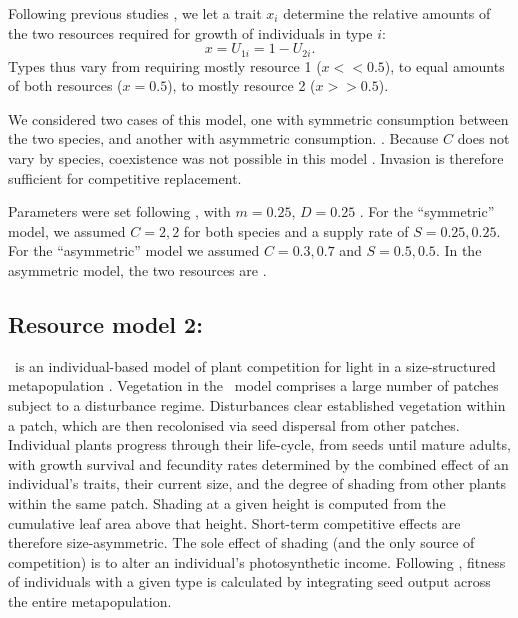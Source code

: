\documentclass[a4paper,11pt]{article}
\newcommand{\verify}[1]{{\color{navy}{(verify: #1)}}}
\begin{document}
Following previous studies \citep{Tilman-1985, Schreiber-2003, Fox-2008}, we let a trait $x_i$ determine the relative amounts of the two resources required for growth of individuals in type $i$: \begin{equation}
\label{eq:R3}
x = U_{1i} = 1 - U_{2i}.
\end{equation}
Types thus vary from requiring mostly resource 1 ($x << 0.5$), to equal amounts of both resources ($x = 0.5$), to mostly resource 2 ($x >> 0.5$).

We considered two cases of this model, one with symmetric consumption \verify{or content?} between the two species, and another with asymmetric consumption. \verify{What does this mean? Is it symmetric across species or with respect to resources?}. \verify{Are symmetric and asymmetric cases both important?} Because $C$ does not vary by species, coexistence was not possible in this model \citep{Tilman-1982}. Invasion is therefore sufficient for competitive replacement.

Parameters were set following \citet{Fox-2008}, with $m = 0.25$, $D=0.25$ \verify{true? Need to update parameters if model has been changed?}. For the ``symmetric'' model, we assumed $C = {2, 2}$ for both species and a supply rate of  $S = {0.25, 0.25}$.  For the ``asymmetric'' model we assumed $C = {0.3, 0.7}$ and $S = {0.5, 0.5}$. In the asymmetric model, the two resources are \verify{consumed at a different by each species}.

\subsection{Resource model 2: \plant }

\plant\ is an individual-based model of plant competition for light in a size-structured metapopulation \citep{Falster-2016, Falster-2017}. Vegetation in the \plant\ model comprises a large number of patches subject to a disturbance regime. Disturbances clear established vegetation within a patch, which are then recolonised via seed dispersal from other patches. Individual plants progress through their life-cycle, from seeds until mature adults, with growth survival and fecundity rates determined by the combined effect of an individual's traits, their current size, and the degree of shading from other plants within the same patch. Shading at a given height is computed from the cumulative leaf area above that height. Short-term competitive effects are therefore size-asymmetric. The sole effect of shading (and the only source of competition) is to alter an individual's photosynthetic income. Following \citep{Falster-2017}, fitness of individuals with a given type is calculated by integrating seed output across the entire metapopulation.
\end{document}
